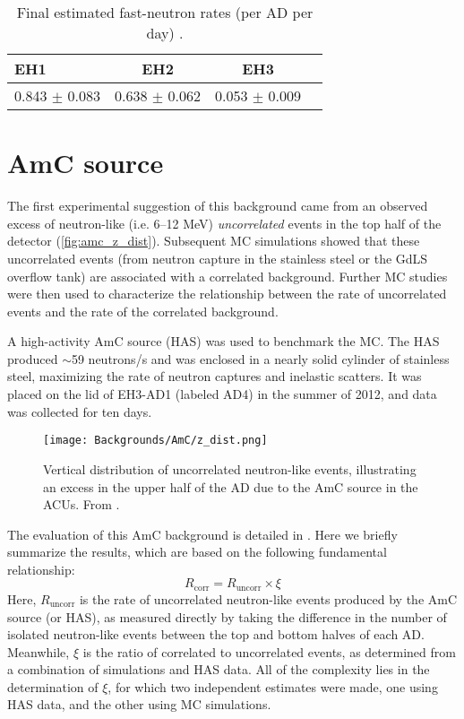 \documentclass[../thesis.tex]{subfiles}
\begin{document}
\begin{table}[ht]
  \begin{tabular}{lccc}
    \toprule
    EH1 & EH2 & EH3 \\
    \midrule
    0.843 $\pm$ 0.083 & 0.638 $\pm$ 0.062 & 0.053 $\pm$ 0.009 \\
    \bottomrule
  \end{tabular}
  \caption{Final estimated fast-neutron rates (per AD per day) \cite{fastn}.}
  \label{tab:bkgFastnFinalRates}
\end{table}


\section{AmC source}
\label{sec:bkgAmC}

The first experimental suggestion of this background came from an observed excess of neutron-like (i.e. 6--12 MeV) \emph{uncorrelated} events in the top half of the detector (\autoref{fig:amc_z_dist}). Subsequent MC simulations showed that these uncorrelated events (from neutron capture in the stainless steel or the GdLS overflow tank) are associated with a correlated background. Further MC studies were then used to characterize the relationship between the rate of uncorrelated events and the rate of the correlated background.

A high-activity AmC source (HAS) was used to benchmark the MC. The HAS produced $\sim$59 neutrons/s and was enclosed in a nearly solid cylinder of stainless steel, maximizing the rate of neutron captures and inelastic scatters. It was placed on the lid of EH3-AD1 (labeled AD4) in the summer of 2012, and data was collected for ten days.

\begin{figure}[ht]
  \texttt{[image: Backgrounds/AmC/z\_dist.png]}
  \caption{Vertical distribution of uncorrelated neutron-like events, illustrating an excess in the upper half of the AD due to the AmC source in the ACUs. From \cite{Gu_2016}.}
  \label{fig:amc_z_dist}
\end{figure}

The evaluation of this AmC background is detailed in \cite{Gu_2016}. Here we briefly summarize the results, which are based on the following fundamental relationship:
\begin{equation}
  \label{eq:bkgAmcFundamental}
  R_{\mathrm{corr}} = R_{\mathrm{uncorr}} \times \xi
\end{equation}
Here, $R_{\mathrm{uncorr}}$ is the rate of uncorrelated neutron-like events produced by the AmC source (or HAS), as measured directly by taking the difference in the number of isolated neutron-like events between the top and bottom halves of each AD. Meanwhile, $\xi$ is the ratio of correlated to uncorrelated events, as determined from a combination of simulations and HAS data. All of the complexity lies in the determination of $\xi$, for which two independent estimates were made, one using HAS data, and the other using MC simulations.
\end{document}
